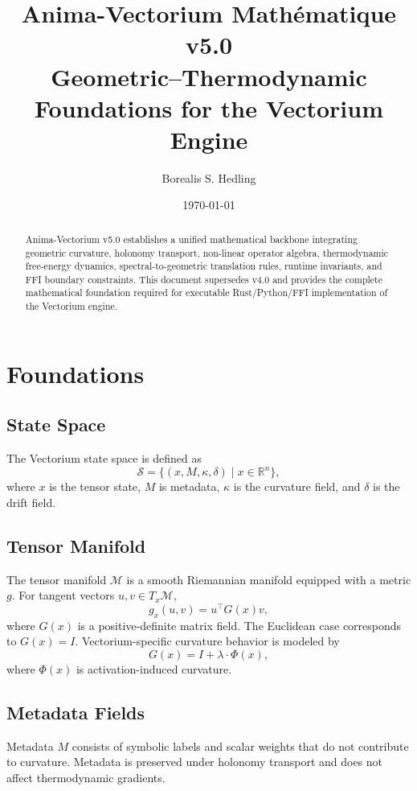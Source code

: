 \documentclass[11pt]{article}
\title{Anima-Vectorium Mathématique v5.0 \\
\large Geometric–Thermodynamic Foundations for the Vectorium Engine}
\author{Borealis S. Hedling}
\date{\today}
\begin{document}
\maketitle

\begin{abstract}
Anima-Vectorium v5.0 establishes a unified mathematical backbone integrating
geometric curvature, holonomy transport, non-linear operator algebra,
thermodynamic free-energy dynamics, spectral-to-geometric translation rules,
runtime invariants, and FFI boundary constraints. This document supersedes v4.0
and provides the complete mathematical foundation required for executable
Rust/Python/FFI implementation of the Vectorium engine.
\end{abstract}

\tableofcontents

\section{Foundations}

\subsection{State Space}
The Vectorium state space is defined as
\[
\mathcal{S} = \{ (x, M, \kappa, \delta) \mid x \in \mathbb{R}^n \},
\]
where $x$ is the tensor state, $M$ is metadata, $\kappa$ is the curvature field,
and $\delta$ is the drift field.

\subsection{Tensor Manifold}
The tensor manifold $\mathcal{M}$ is a smooth Riemannian manifold equipped with
a metric $g$. For tangent vectors $u, v \in T_x\mathcal{M}$,
\[
g_x(u, v) = u^\top G(x) v,
\]
where $G(x)$ is a positive-definite matrix field. The Euclidean case corresponds
to $G(x) = I$. Vectorium-specific curvature behavior is modeled by
\[
G(x) = I + \lambda \cdot \Phi(x),
\]
where $\Phi(x)$ is activation-induced curvature.

\subsection{Metadata Fields}
Metadata $M$ consists of symbolic labels and scalar weights that do not
contribute to curvature. Metadata is preserved under holonomy transport and
does not affect thermodynamic gradients.
\end{document}
